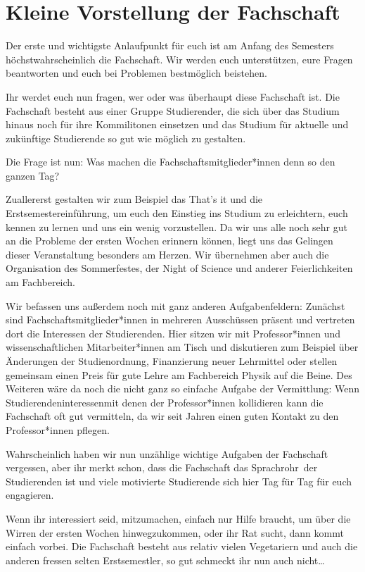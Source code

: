 \section[Die Fachschaft]{Kleine Vorstellung der Fachschaft}

Der erste und wichtigste Anlaufpunkt für euch ist am Anfang des Semesters höchstwahrscheinlich die Fachschaft.
Wir werden euch unterstützen, eure Fragen beantworten und euch bei Problemen bestmöglich beistehen.

Ihr werdet euch nun fragen, wer oder was überhaupt diese Fachschaft ist. Die Fachschaft besteht aus einer Gruppe Studierender, die sich über das Studium hinaus noch für ihre Kommilitonen einsetzen und das Studium für aktuelle und zukünftige Studierende so gut wie möglich zu gestalten.

Die Frage ist nun: \glqq Was machen die Fachschaftsmitglieder*innen denn so den ganzen Tag?\grqq

Zuallererst gestalten wir zum Beispiel das That's it und die Erstsemestereinführung, um euch den Einstieg ins Studium zu erleichtern, euch kennen zu lernen und uns ein wenig vorzustellen. Da wir uns alle noch sehr gut an die Probleme der ersten Wochen erinnern können, liegt uns das Gelingen dieser Veranstaltung besonders am Herzen. Wir übernehmen aber auch die Organisation des Sommerfestes, der Night of Science und anderer Feierlichkeiten am Fachbereich.

Wir befassen uns außerdem noch mit ganz anderen Aufgabenfeldern:
Zunächst sind Fachschaftsmitglieder*innen in mehreren Ausschüssen präsent und vertreten dort die Interessen der Studierenden. Hier sitzen wir mit Professor*innen und wissenschaftlichen Mitarbeiter*innen am Tisch und diskutieren zum Beispiel über Änderungen der Studienordnung, Finanzierung neuer Lehrmittel oder stellen gemeinsam einen Preis für gute Lehre am Fachbereich Physik auf die Beine.
Des Weiteren wäre da noch die nicht ganz so einfache Aufgabe der Vermittlung:
Wenn \glqq Studierendeninteressen\grqq  mit denen der Professor*innen kollidieren kann die Fachschaft oft gut vermitteln, da wir seit Jahren einen guten Kontakt zu den Professor*innen pflegen.


Wahrscheinlich haben wir nun unzählige wichtige Aufgaben der Fachschaft vergessen, aber ihr merkt schon, dass die Fachschaft das \glqq Sprachrohr\grqq \ der Studierenden ist und viele motivierte Studierende sich hier Tag für Tag für euch engagieren.

Wenn ihr interessiert seid, mitzumachen, einfach nur Hilfe braucht, um über die Wirren der ersten Wochen hinwegzukommen,
oder ihr Rat sucht, dann kommt einfach vorbei. Die Fachschaft besteht aus relativ vielen Vegetariern und auch die anderen fressen selten Erstsemestler, so gut schmeckt ihr nun auch nicht\ldots

